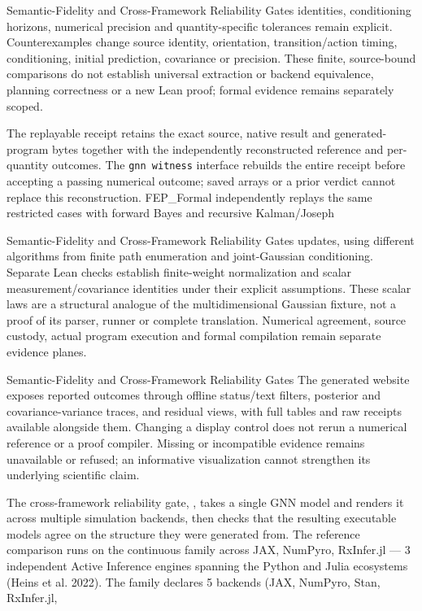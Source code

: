 \documentclass[
  ignorenonframetext,
]{beamer}
\begin{document}
\begin{frame}{Semantic-Fidelity and
Cross-Framework Reliability Gates}
identities, conditioning horizons, numerical precision and
quantity-specific tolerances remain explicit. Counterexamples change
source identity, orientation, transition/action timing, conditioning,
initial prediction, covariance or precision. These finite, source-bound
comparisons do not establish universal extraction or backend
equivalence, planning correctness or a new Lean proof; formal evidence
remains separately scoped.

The replayable  receipt retains the
exact source, native result and generated-program bytes together with
the independently reconstructed reference and per-quantity outcomes. The
\texttt{gnn\ witness} interface rebuilds the entire receipt before
accepting a passing numerical outcome; saved arrays or a prior verdict
cannot replace this reconstruction. FEP\_Formal independently replays
the same restricted cases with forward Bayes and recursive Kalman/Joseph
\end{frame}

\begin{frame}{Semantic-Fidelity and
Cross-Framework Reliability Gates}
updates, using different algorithms from finite path enumeration and
joint-Gaussian conditioning. Separate Lean checks establish
finite-weight normalization and scalar measurement/covariance identities
under their explicit assumptions. These scalar laws are a structural
analogue of the multidimensional Gaussian fixture, not a proof of its
parser, runner or complete translation. Numerical agreement, source
custody, actual program execution and formal compilation remain separate
evidence planes.

\end{frame}

\begin{frame}{Semantic-Fidelity and
Cross-Framework Reliability Gates}
The generated website exposes reported outcomes through offline
status/text filters, posterior and covariance-variance traces, and
residual views, with full tables and raw receipts available alongside
them. Changing a display control does not rerun a numerical reference or
a proof compiler. Missing or incompatible evidence remains unavailable
or refused; an informative visualization cannot strengthen its
underlying scientific claim.

The cross-framework reliability gate,
, takes a single
GNN model and renders it across multiple simulation backends, then
checks that the resulting executable models agree on the structure they
were generated from. The reference comparison runs on the continuous
family across JAX, NumPyro, RxInfer.jl --- 3 independent Active
Inference engines spanning the Python and Julia ecosystems (Heins et al.
2022). The family declares 5 backends (JAX, NumPyro, Stan, RxInfer.jl,
\end{frame}
\end{document}
